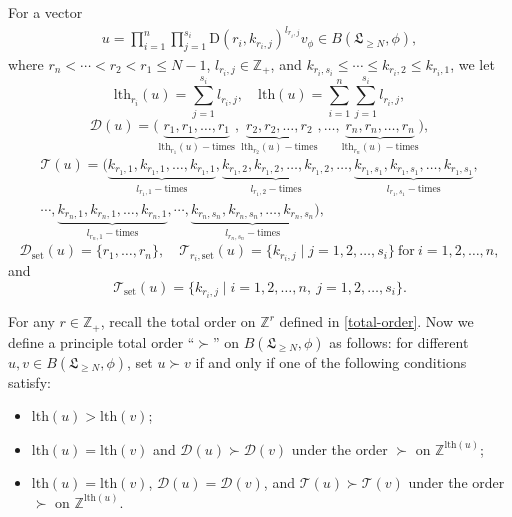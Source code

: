 \documentclass[12pt, a4paper]{amsart}
\newcommand{\Z}{\mathbb Z}
\newcommand{\rD}{\mathrm{D}}
\theoremstyle{Theorem}
\theoremstyle{Theorem}
\numberwithin{equation}{section}
\begin{document}
For a vector \begin{eqnarray}\label{Vir-case}u=\prod_{i=1}^{n}\prod_{j=1}^{s_{i}}
\rD(r_{i},k_{r_{i},j})^{l_{r_{i},j}}v_{\phi}\in B(\mathfrak{L}_{\geq N},\phi),\end{eqnarray}
where $r_{n}<\cdots<r_{2}<r_{1}\leq N-1$, $l_{r_{i},j}\in\Z_{+}$, and $k_{r_{i},s_{i}}\leq\cdots\leq k_{r_{i},2}\leq k_{r_{i},1}$,
we let \[\mathrm{lth}_{r_{i}}(u)=\sum_{j=1}^{s_{i}}l_{r_{i},j},\quad
\mathrm{lth}(u)=\sum_{i=1}^{n}\sum_{j=1}^{s_{i}}l_{r_{i},j},\]
\[\mathcal{D}(u)=\big(\underbrace{r_{1},r_{1},\dots,r_{1}}_{\mathrm{lth}_{r_{1}}(u)-\mathrm{times}},
\underbrace{r_{2},r_{2},\dots,r_{2}}_{\mathrm{lth}_{r_{2}}(u)-\mathrm{times}},\dots,
\underbrace{r_{n},r_{n},\dots,r_{n}}_{\mathrm{lth}_{r_{n}}(u)-\mathrm{times}}\big),\]
$$\begin{aligned}\mathcal{T}(u)=\big(\underbrace{k_{r_{1},1},k_{r_{1},1},\dots,k_{r_{1},1}}_{l_{r_{1},1}-\mathrm{times}},
\underbrace{k_{r_{1},2},k_{r_{1},2},\dots,k_{r_{1},2}}_{l_{r_{1},2}-\mathrm{times}},\dots,
\underbrace{k_{r_{1},s_{1}},k_{r_{1},s_{1}},\dots,k_{r_{1},s_{1}}}_{l_{r_{1},s_{1}}-\mathrm{times}},\\ \cdots,
\underbrace{k_{r_{n},1},k_{r_{n},1},\dots,k_{r_{n},1}}_{l_{r_{n},1}-\mathrm{times}},\cdots,
\underbrace{k_{r_{n},s_{n}},k_{r_{n},s_{n}},\dots,k_{r_{n},s_{n}}}_{l_{r_{n},s_{n}}-\mathrm{times}}\big),\end{aligned}$$
\[\mathcal{D}_{\mathrm{set}}(u)=\{r_{1},\dots,r_{n}\},\quad\mathcal{T}_{r_{i},
\mathrm{set}}(u)=\{k_{r_{i},j}\mid j=1,2,\dots,s_{i}\}\ \text{for}\ i=1,2,\dots,n,\]and
\[\mathcal{T}_{\mathrm{set}}(u)=\{k_{r_{i},j}\mid i=1,2,\dots,n,\ j=1,2,\dots,s_{i}\}.\]

For any $r\in\Z_{+}$, recall the total order on $\Z^{r}$ defined in \eqref{total-order}.
Now we define a principle total order ``$\succ$'' on $B(\mathfrak{L}_{\geq N},\phi)$ as follows:
for different $u,v\in B(\mathfrak{L}_{\geq N},\phi)$, set $u\succ v$ if and only if one of the following conditions satisfy:
     \begin{itemize}
     \item $\text{lth}(u)>\text{lth}(v)$;
     \item $\text{lth}(u)=\text{lth}(v)$ and $\mathcal{D}(u)\succ\mathcal{D}(v)$
     under the order $\succ$ on $\Z^{\text{lth}(u)}$;
     \item $\text{lth}(u)=\text{lth}(v)$, $\mathcal{D}(u)=\mathcal{D}(v)$,
     and $\mathcal{T}(u)\succ\mathcal{T}(v)$
     under the order $\succ$ on $\Z^{\text{lth}(u)}$.
     \end{itemize}
\end{document}
